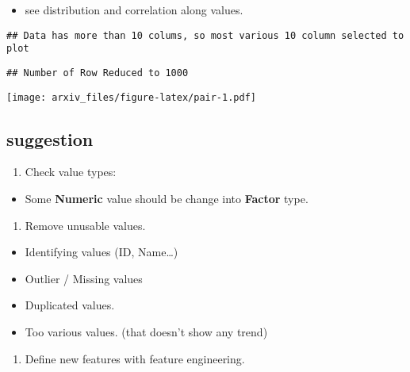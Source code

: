\documentclass{article}
\providecommand{\tightlist}{%
  \setlength{\itemsep}{0pt}\setlength{\parskip}{0pt}}
\begin{document}
\begin{itemize}
\tightlist
\item
  see distribution and correlation along values.
\end{itemize}

\begin{verbatim}
## Data has more than 10 colums, so most various 10 column selected to plot
\end{verbatim}

\begin{verbatim}
## Number of Row Reduced to 1000
\end{verbatim}

\texttt{[image: arxiv\_files/figure-latex/pair-1.pdf]}

\newpage

\hypertarget{suggestion}{%
\subsection{suggestion}\label{suggestion}}

\begin{enumerate}
\def\labelenumi{\arabic{enumi}.}
\tightlist
\item
  Check value types:
\end{enumerate}

\begin{itemize}
\tightlist
\item
  Some \textbf{Numeric} value should be change into \textbf{Factor}
  type.
\end{itemize}

\begin{enumerate}
\def\labelenumi{\arabic{enumi}.}
\setcounter{enumi}{1}
\tightlist
\item
  Remove unusable values.
\end{enumerate}

\begin{itemize}
\item
  Identifying values (ID, Name\ldots)
\item
  Outlier / Missing values
\item
  Duplicated values.
\item
  Too various values. (that doesn't show any trend)
\end{itemize}

\begin{enumerate}
\def\labelenumi{\arabic{enumi}.}
\setcounter{enumi}{2}
\tightlist
\item
  Define new features with feature engineering.
\end{enumerate}



\end{document}
